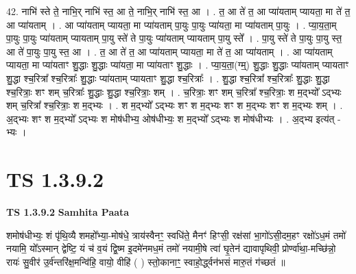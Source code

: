 \documentclass[17pt]{extarticle}
\begin{document}
42. नाभि॑ स्ते ते॒ नाभि॒र् नाभि॑ स्त॒ आ ते॒ नाभि॒र् नाभि॑ स्त॒ आ । . त॒ आ ते॑ त॒ आ प्या॑यताम् प्यायता॒ मा ते॑ त॒ आ प्या॑यताम् । . आ प्या॑यताम् प्यायता॒ मा प्या॑यताम् पा॒युः पा॒युः प्या॑यता॒ मा प्या॑यताम् पा॒युः । . प्या॒य॒ता॒म् पा॒युः पा॒युः प्या॑यताम् प्यायताम् पा॒यु स्ते॑ ते पा॒युः प्या॑यताम् प्यायताम् पा॒यु स्ते᳚ । . पा॒यु स्ते॑ ते पा॒युः पा॒यु स्त॒ आ ते॑ पा॒युः पा॒यु स्त॒ आ । . त॒ आ ते॑ त॒ आ प्या॑यताम् प्यायता॒ मा ते॑ त॒ आ प्या॑यताम् । . आ प्या॑यताम् प्यायता॒ मा प्या॑यताꣳ शु॒द्धाः शु॒द्धाः प्या॑यता॒ मा प्या॑यताꣳ शु॒द्धाः । . प्या॒य॒ता॒(ग्म्॒) शु॒द्धाः शु॒द्धाः प्या॑यताम् प्यायताꣳ शु॒द्धा श्च॒रित्रा᳚ श्च॒रित्राः᳚ शु॒द्धाः प्या॑यताम् प्यायताꣳ शु॒द्धा श्च॒रित्राः᳚ । . शु॒द्धा श्च॒रित्रा᳚ श्च॒रित्राः᳚ शु॒द्धाः शु॒द्धा श्च॒रित्राः॒ शꣳ शम् च॒रित्राः᳚ शु॒द्धाः शु॒द्धा श्च॒रित्राः॒ शम् । . च॒रित्राः॒ शꣳ शम् च॒रित्रा᳚ श्च॒रित्राः॒ श म॒द्भ्यो᳚ ऽद्भ्यः शम् च॒रित्रा᳚ श्च॒रित्राः॒ श म॒द्भ्यः । . श म॒द्भ्यो᳚ ऽद्भ्यः शꣳ श म॒द्भ्यः शꣳ श म॒द्भ्यः शꣳ श म॒द्भ्यः शम् । . अ॒द्भ्यः शꣳ श म॒द्भ्यो᳚ ऽद्भ्यः श मोष॑धीभ्य॒ ओष॑धीभ्यः॒ श म॒द्भ्यो᳚ ऽद्भ्यः श मोष॑धीभ्यः । . अ॒द्भ्य इत्य॑त् - भ्यः । \newline
\pagebreak
{}
\section*{ TS 1.3.9.2 }

\textbf{TS 1.3.9.2 } \newline
\textbf{Samhita Paata} \newline

शमोष॑धीभ्यः॒ शं पृ॑थि॒व्यै शमहो᳚भ्या॒-मोष॑धे॒ त्राय॑स्वैनꣳ॒॒ स्वधि॑ते॒ मैनꣳ॑ हिꣳसी॒ रक्ष॑सां भा॒गो॑ऽसी॒दम॒हꣳ रक्षो॑ऽध॒मं तमो॑ नयामि॒ यो᳚ऽस्मान् द्वेष्टि॒ यं च॑ व॒यं द्वि॒ष्म इ॒दमे॑नमध॒मं तमो॑ नयामी॒षे त्वा॑ घृ॒तेन॑ द्यावापृथिवी॒ प्रोर्ण्वा॑था॒-मच्छि॑न्नो॒ रायः॑ सु॒वीर॑ उ॒र्व॑न्तरि॑क्ष॒मन्वि॑हि॒ वायो॒ वीहि॑ ( ) स्तो॒कानाꣳ॒॒ स्वाहो॒र्द्ध्वन॑भसं मारु॒तं ग॑च्छतं ॥ \newline
\end{document}
